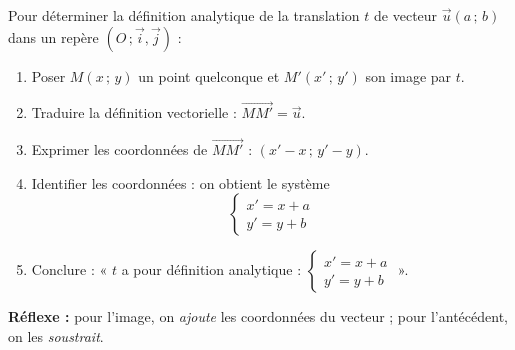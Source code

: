 \documentclass[11pt]{article}
\begin{document}
\begin{methode}
Pour déterminer la définition analytique de la translation $t$ de vecteur $\vec{u}(a\,;\,b)$ dans un repère $(O\,;\vec{i},\vec{j})$ :
\begin{enumerate}
\item Poser $M(x\,;\,y)$ un point quelconque et $M'(x'\,;\,y')$ son image par $t$.
\item Traduire la définition vectorielle : $\overrightarrow{MM'} = \vec{u}$.
\item Exprimer les coordonnées de $\overrightarrow{MM'}$ : $(x' - x\,;\, y' - y)$.
\item Identifier les coordonnées : on obtient le système
\[ \begin{cases} x' = x + a \\ y' = y + b \end{cases} \]
\item Conclure : « $t$ a pour définition analytique : $\begin{cases} x' = x + a \\ y' = y + b \end{cases}$ ».
\end{enumerate}
\textbf{Réflexe :} pour l'image, on \emph{ajoute} les coordonnées du vecteur ; pour l'antécédent, on les \emph{soustrait}.
\end{methode}
\end{document}
